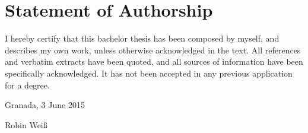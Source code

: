 \thispagestyle{empty}

\section*{Statement of Authorship}
I hereby certify that this bachelor thesis has been composed by myself, and describes my own work, unless otherwise acknowledged in the text. All references and verbatim extracts have been quoted, and all sources of information have been specifically acknowledged. It has not been accepted in any previous application for a degree.

\vspace{1cm}

\noindent 
Granada, 3 June 2015

\vspace{2cm}

\noindent
Robin Weiß
